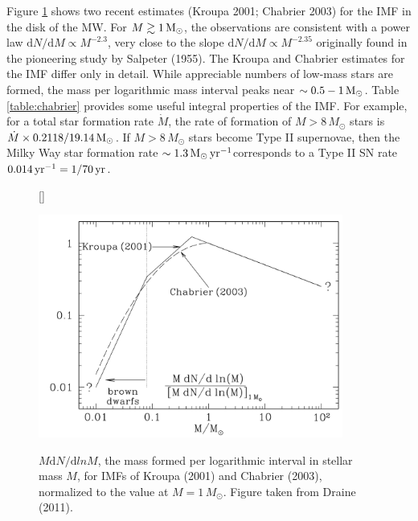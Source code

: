 \documentclass[a4paper,10pt]{article}
\begin{document}
{\noindent}Figure \ref{fig:KroupaChabrier} shows two recent estimates (Kroupa 2001; Chabrier 2003) for the IMF in the disk of the MW. For $M\gtrsim1\,{\rm M_\odot}$, the observations are consistent with a power law $\mathrm{d}N/\mathrm{d}M\propto M^{-2.3}$, very close to the slope $\mathrm{d}N/\mathrm{d}M\propto M^{-2.35}$ originally found in the pioneering study by Salpeter (1955). The Kroupa and Chabrier estimates for the IMF differ only in detail. While appreciable numbers of low-mass stars are formed, the mass per logarithmic mass interval peaks near $\sim0.5-1\,{\rm M_\odot}$. Table \ref{table:chabrier} provides some useful integral properties of the IMF. For example, for a total star formation rate $\dot{M}$, the rate of formation of $M>8\,{M_\odot}$ stars is $\dot{M}\times0.2118/19.14\,{\rm M_\odot}$. If $M>8\,{M_\odot}$ stars become Type II supernovae, then the Milky Way star formation rate $\sim1.3\,{\rm M_\odot\,yr^{-1}}$corresponds to a Type II SN rate $0.014\,{\rm yr^{-1}}=1/70\,{\rm yr}$.

\begin{figure}[h]
    [\FBwidth]
    {\caption{\footnotesize{$M\mathrm{d}N/\mathrm{d}lnM$, the mass formed per logarithmic interval in stellar mass $M$, for IMFs of Kroupa (2001) and Chabrier (2003), normalized to the value at $M=1\,{M_\odot}$. Figure taken from Draine (2011).}}
    \label{fig:KroupaChabrier}}
    {\includegraphics[width=10cm]{figures/KroupaChabrier.png}}
\end{figure}
\end{document}
